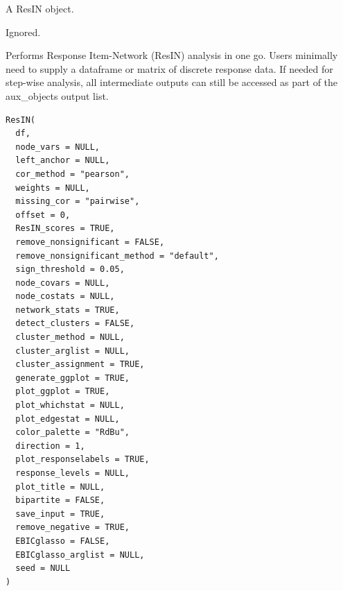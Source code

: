 \documentclass[a4paper]{book}
\begin{document}
%
\begin{Arguments}
\begin{ldescription}
\item[\code{x}] A ResIN object.

\item[\code{...}] Ignored.
\end{ldescription}
\end{Arguments}
%
\begin{Description}
Performs Response Item-Network (ResIN) analysis in one go. Users minimally need to supply a dataframe or matrix of discrete response data. If needed for step-wise analysis, all intermediate outputs can still be accessed as part of the aux\_objects output list.
\end{Description}
%
\begin{Usage}
\begin{verbatim}
ResIN(
  df,
  node_vars = NULL,
  left_anchor = NULL,
  cor_method = "pearson",
  weights = NULL,
  missing_cor = "pairwise",
  offset = 0,
  ResIN_scores = TRUE,
  remove_nonsignificant = FALSE,
  remove_nonsignificant_method = "default",
  sign_threshold = 0.05,
  node_covars = NULL,
  node_costats = NULL,
  network_stats = TRUE,
  detect_clusters = FALSE,
  cluster_method = NULL,
  cluster_arglist = NULL,
  cluster_assignment = TRUE,
  generate_ggplot = TRUE,
  plot_ggplot = TRUE,
  plot_whichstat = NULL,
  plot_edgestat = NULL,
  color_palette = "RdBu",
  direction = 1,
  plot_responselabels = TRUE,
  response_levels = NULL,
  plot_title = NULL,
  bipartite = FALSE,
  save_input = TRUE,
  remove_negative = TRUE,
  EBICglasso = FALSE,
  EBICglasso_arglist = NULL,
  seed = NULL
)
\end{verbatim}
\end{Usage}
%
\end{document}
